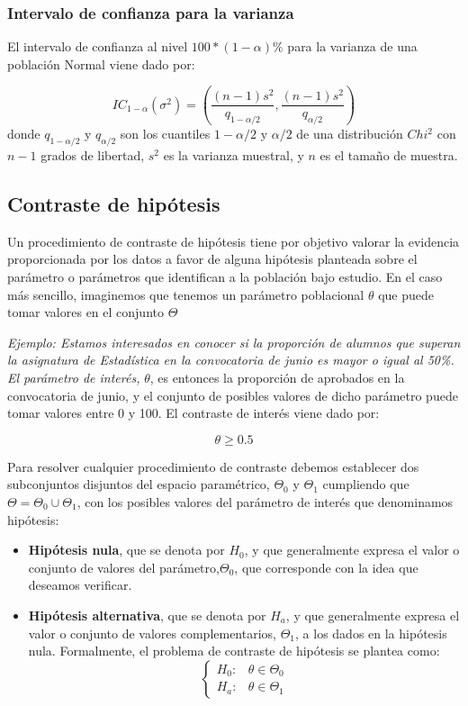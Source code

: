 \documentclass[
]{book}
\providecommand{\tightlist}{%
  \setlength{\itemsep}{0pt}\setlength{\parskip}{0pt}}
\begin{document}
\hypertarget{intervalo-de-confianza-para-la-varianza}{%
\subsubsection{Intervalo de confianza para la varianza}\label{intervalo-de-confianza-para-la-varianza}}

El intervalo de confianza al nivel \(100*(1 - \alpha)\%\) para la varianza de una población Normal viene dado por:

\[IC_{1-\alpha}(\sigma^2) = \left(\frac{(n-1)s^2}{q_{1-\alpha/2}}, \frac{(n-1)s^2}{q_{\alpha/2}}\right)\] donde \(q_{1-\alpha/2}\) y \(q_{\alpha/2}\) son los cuantiles \(1-\alpha/2\) y \(\alpha/2\) de una distribución \(Chi^2\) con \(n-1\) grados de libertad, \(s^2\) es la varianza muestral, y \(n\) es el tamaño de muestra.

\hypertarget{contraste-de-hipuxf3tesis}{%
\subsection{Contraste de hipótesis}\label{contraste-de-hipuxf3tesis}}

Un procedimiento de contraste de hipótesis tiene por objetivo valorar la evidencia proporcionada por los datos a favor de alguna hipótesis planteada sobre el parámetro o parámetros que identifican a la población bajo estudio. En el caso más sencillo, imaginemos que tenemos un parámetro poblacional \(\theta\) que puede tomar valores en el conjunto \(\Theta\)

\emph{Ejemplo: Estamos interesados en conocer si la proporción de alumnos que superan la asignatura de Estadística en la convocatoria de junio es mayor o igual al 50\%. El parámetro de interés,} \(\theta\), es entonces la proporción de aprobados en la convocatoria de junio, y el conjunto de posibles valores de dicho parámetro puede tomar valores entre 0 y 100. El contraste de interés viene dado por:

\[\theta \geq 0.5\]

Para resolver cualquier procedimiento de contraste debemos establecer dos subconjuntos disjuntos del espacio paramétrico, \(\Theta_0\) y \(\Theta_1\) cumpliendo que \(\Theta = \Theta_0 \cup \Theta_1\), con los posibles valores del parámetro de interés que denominamos hipótesis:

\begin{itemize}
\tightlist
\item
  \textbf{Hipótesis nula}, que se denota por \(H_0\), y que generalmente expresa el valor o conjunto de valores del parámetro,\(\Theta_0\), que corresponde con la idea que deseamos verificar.
\item
  \textbf{Hipótesis alternativa}, que se denota por \(H_a\), y que generalmente expresa el valor o conjunto de valores complementarios, \(\Theta_1\), a los dados en la hipótesis nula. Formalmente, el problema de contraste de hipótesis se plantea como: \[\left\{\begin{array}{ll} H_0: & \theta \in \Theta_0\\ H_a: & \theta \in \Theta_1\end{array}\right.\]
\end{itemize}
\end{document}
